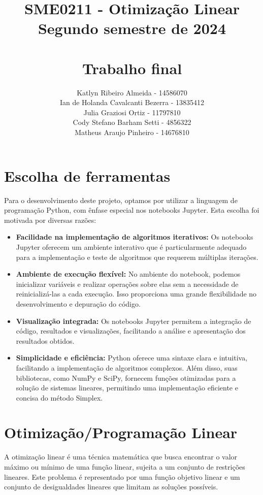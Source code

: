 \documentclass{article}
\title{SME0211 - Otimização Linear\\
Segundo semestre de 2024\\ 

\textbf{\\Trabalho final}}
\author{
Katlyn Ribeiro Almeida - 14586070\\
Ian de Holanda Cavalcanti Bezerra - 13835412 \\
Julia Graziosi Ortiz - 11797810\\
Cody Stefano Barham Setti - 4856322\\
Matheus Araujo Pinheiro - 14676810
}
\begin{document}
\maketitle
\section{Escolha de ferramentas}

Para o desenvolvimento deste projeto, optamos por utilizar a linguagem de programação Python, com ênfase especial nos notebooks Jupyter. Esta escolha foi motivada por diversas razões:

\begin{itemize}
    \item \textbf{Facilidade na implementação de algoritmos iterativos:} Os notebooks Jupyter oferecem um ambiente interativo que é particularmente adequado para a implementação e teste de algoritmos que requerem múltiplas iterações.
    
    \item \textbf{Ambiente de execução flexível:} No ambiente do notebook, podemos inicializar variáveis e realizar operações sobre elas sem a necessidade de reinicializá-las a cada execução. Isso proporciona uma grande flexibilidade no desenvolvimento e depuração do código.
    
    \item \textbf{Visualização integrada:} Os notebooks Jupyter permitem a integração de código, resultados e visualizações, facilitando a análise e apresentação dos resultados obtidos.
    
    \item \textbf{Simplicidade e eficiência:} Python oferece uma sintaxe clara e intuitiva, facilitando a implementação de algoritmos complexos. Além disso, suas bibliotecas, como NumPy e SciPy, fornecem funções otimizadas para a solução de sistemas lineares, permitindo uma implementação eficiente e concisa do método Simplex.
\end{itemize}


\section{Otimização/Programação Linear}

A otimização linear é uma técnica matemática que busca encontrar o valor máximo ou mínimo de uma função linear, sujeita a um conjunto de restrições lineares. Este problema é representado por uma função objetivo linear e um conjunto de desigualdades lineares que limitam as soluções possíveis.
\end{document}
